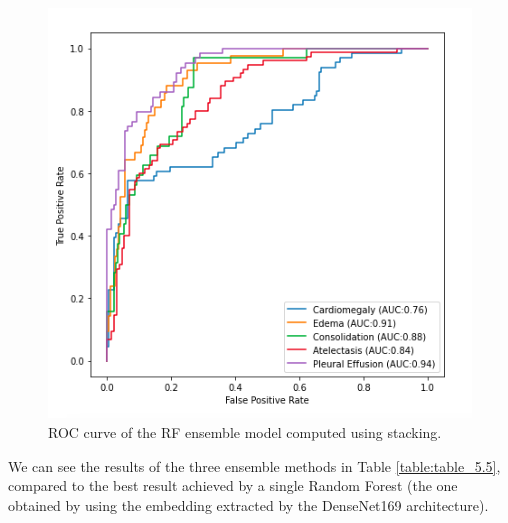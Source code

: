 \begin{figure}[htbp!]
    \centering
    \includegraphics[scale=0.55]{Tesi/images/Results/rf_stacking.png}
    \caption[ROC curve for RF stacking ensemble]{ROC curve of the RF ensemble model computed using stacking.}
    \label{fig:figure_5.11}
\end{figure}

We can see the results of the three ensemble methods in Table \ref{table:table_5.5}, compared to the best result achieved by a single Random Forest (the one obtained by using the embedding extracted by the DenseNet169 architecture).


\begin{table}[h!]
\centering
{}
\caption[\ac{RF} ensemble AUROC comparison]{AUROC values obtained using different Ensemble policies combining Random Forest models trained using the embeddings. For each label, the highest AUROC is boldfaced.}
\label{table:table_5.5}
\end{table}

